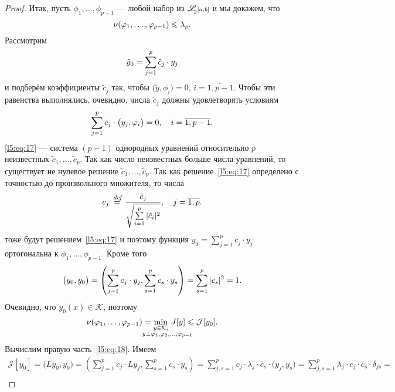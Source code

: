 \documentclass[12pt,a4paper,openany,fleqn]{book}
\newcommand {\defeq}{\stackrel{\hspace{0.09 cm}de\!f}{=}}
\newcommand {\eqdef}{\defeq}
\newcommand{\J}{\ensuremath{\mathcal{J}}}
\newcommand{\mc}[1]{\ensuremath{\mathcal{#1}}}
\newcommand{\K}{\mc{K}}
\newcommand{\fL}[1][{[a,b]}]{\ensuremath{\mathscr{L}\hspace*{-0.11 cm}{\mathstrut}_{2}{\scriptstyle#1}}}
\theoremstyle{definition}
\begin{document}
\begin{proof}
Итак, пусть $\phi_1,\ldots,\phi_{p-1}$ --- любой набор из $\fL$ и мы докажем, что
\begin{equation}
	\label{l5:eq:16}
	\hfill\nu(\phi_1,\ldots,\phi_{p-1})\leqslant\lambda_p.\hfill
\end{equation}  
Рассмотрим 
\begin{equation*}
	\hfill \tilde{y}_0=\sum\limits_{j=1}^{p}\tilde{c}_j\cdot y_j\hfill
\end{equation*}
и подберём коэффициенты $\tilde{c}_j$ так, чтобы $\big(\tilde{y},\phi_i\big)=0,\,i=\overline{1,p-1}$. Чтобы эти равенства выполнялись, очевидно, числа $\tilde{c}_j$ должны удовлетворять условиям
\begin{equation}
	\label{l5:eq:17}
	\hfill \sum\limits_{j=1}^{p}\tilde{c}_j\cdot \big(y_j,\phi_i\big)=0,\quad i=\overline{1,p-1}.\hfill
\end{equation} 
\eqref{l5:eq:17} --- система $(p-1)$ однородных уравнений относительно $p$ неизвестных $\tilde{c}_1,\ldots,\tilde{c}_p$. Так как число неизвестных больше числа уравнений, то существует не нулевое решение $\tilde{c}_1,\ldots,\tilde{c}_p$. Так как решение~\eqref{l5:eq:17} определено с точностью до произвольного множителя, то числа 
\begin{equation*}
	\hfill c_j\eqdef\frac{\tilde{c}_j}{\sqrt{\sum\limits_{i=1}^p|\tilde{c}_i|^2}},\quad j=\overline{1,p}.\hfill
\end{equation*}
тоже будут решением~\eqref{l5:eq:17} и поэтому функция $\displaystyle y_0=\sum\limits_{j=1}^{p}c_j\cdot y_j$ ортогональна к $\phi_1,\ldots,\phi_{p-1}$. Кроме того
\begin{equation*}
	\hfill\big(y_0,y_0\big)=\left(\sum\limits_{j=1}^{p}c_j\cdot y_j,\sum\limits_{s=1}^{p}c_s\cdot y_s\right)=\sum\limits_{s=1}^p|c_s|^2=1.\hfill
\end{equation*}
Очевидно, что $y_0(x)\in\K$, поэтому
\begin{equation}
	\label{l5:eq:18}
	\hfill\nu(\phi_1,\ldots,\phi_{p-1})=\min\limits_{\substack{y\in\K,\\\lefteqn{\scriptstyle \hspace*{-0.8cm}y\perp\phi_1,\phi_2,\ldots,\phi_{p-1}}}}\,J[y]\leqslant\J[y_0].\hfill
\end{equation} 
Вычислим правую часть~\eqref{l5:eq:18}. Имеем
\begin{multline}
	\label{l5:eq:19}
	\J[y_0]=\big(Ly_0,y_0\big)=\left(\sum\limits_{j=1}^{p}c_j\cdot Ly_j,\sum\limits_{s=1}^{p}c_s\cdot y_s\right)=\sum\limits_{j,s=1}^{p}c_j\cdot\lambda_j\cdot\overline{c}_s\cdot\big(y_j,y_s\big)=\sum\limits_{j,s=1}^{p}\lambda_j\cdot c_j\cdot\overline{c}_s\cdot\delta_{js}=\\

\end{multline}
\end{proof}
\end{document}
